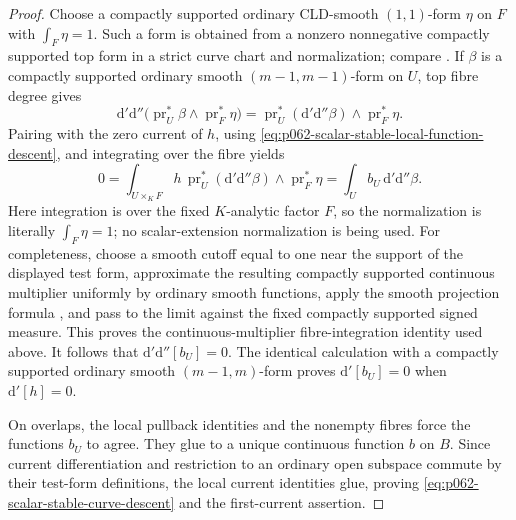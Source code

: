 \begin{proof}
Choose a compactly supported ordinary CLD-smooth $(1,1)$-form $\eta$ on
$F$ with $\int_F\eta=1$.  Such a form is obtained from a nonzero
nonnegative compactly supported top form in a strict curve chart and
normalization; compare
\cite[Proposition~11.1 and Example~11.7]{GJR26}.  If $\beta$ is a compactly
supported ordinary smooth $(m-1,m-1)$-form on $U$, top fibre degree gives
\[
 \mathrm d'\mathrm d''\bigl(\operatorname{pr}_U^*\beta
       \wedge\operatorname{pr}_F^*\eta\bigr)
 =\operatorname{pr}_U^*(\mathrm d'\mathrm d''\beta)
       \wedge\operatorname{pr}_F^*\eta.
\]
Pairing with the zero current of $h$, using
\eqref{eq:p062-scalar-stable-local-function-descent}, and integrating over
the fibre yields
\[
 0=\int_{U\times_KF}h\,
       \operatorname{pr}_U^*(\mathrm d'\mathrm d''\beta)
       \wedge\operatorname{pr}_F^*\eta
   =\int_U b_U\,\mathrm d'\mathrm d''\beta.
\]
Here integration is over the fixed $K$-analytic factor $F$, so the
normalization is literally $\int_F\eta=1$; no scalar-extension
normalization is being used.  For completeness, choose a smooth cutoff
equal to one near the support of the displayed test form, approximate the
resulting compactly supported continuous multiplier uniformly by ordinary
smooth functions, apply the smooth projection formula
\cite[Theorem~16.5.4 and Corollary~16.5.5]{CLD25}, and pass to the limit
against the fixed compactly supported signed measure.  This proves the
continuous-multiplier fibre-integration identity used above.  It follows that
$\mathrm d'\mathrm d''[b_U]=0$.  The identical calculation with a
compactly supported ordinary smooth $(m-1,m)$-form proves
$\mathrm d'[b_U]=0$ when $\mathrm d'[h]=0$.

On overlaps, the local pullback identities and the nonempty fibres force
the functions $b_U$ to agree.  They glue to a unique continuous function
$b$ on $B$.  Since current differentiation and restriction to an ordinary
open subspace commute by their test-form definitions, the local current
identities glue, proving
\eqref{eq:p062-scalar-stable-curve-descent} and the first-current assertion.
\end{proof}
